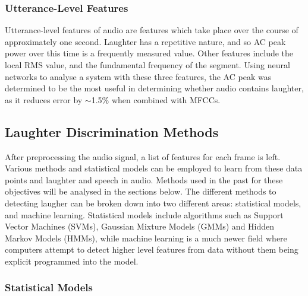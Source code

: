 \documentclass[a4paper,11pt,notitlepage]{article}
\begin{document}
\subsubsection{Utterance-Level Features}

Utterance-level features of audio are features which take place over the course of approximately one second. Laughter has a repetitive nature, and so AC peak power over this time is a frequently measured value. Other features include the local RMS value, and the fundamental frequency of the segment. Using neural networks to analyse a system with these three features, the AC peak was determined to be the most useful in determining whether audio contains laughter, as it reduces error by $\sim$1.5\% when combined with MFCCs.\cite{knox2007automatic}

\newpage

\subsection{Laughter Discrimination Methods}

After preprocessing the audio signal, a list of features for each frame is left. Various methods and statistical models can be employed to learn from these data points and laughter and speech in audio. Methods used in the past for these objectives will be analysed in the sections below. The different methods to detecting laugher can be broken down into two different areas: statistical models, and machine learning. Statistical models include algorithms such as Support Vector Machines (SVMs), Gaussian Mixture Models (GMMs) and Hidden Markov Models (HMMs), while machine learning is a much newer field where computers attempt to detect higher level features from data without them being explicit programmed into the model.

\subsubsection{Statistical Models}
\end{document}
